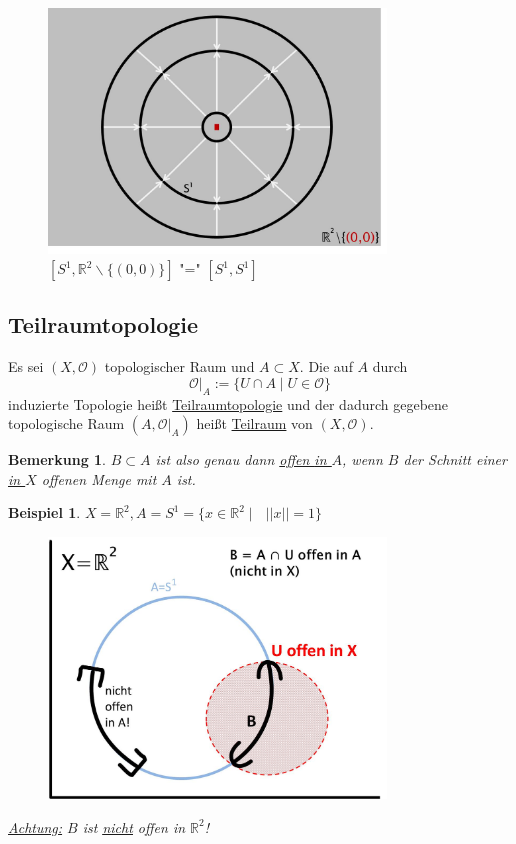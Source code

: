 \documentclass[a4paper,11pt,notitlepage]{report}
\newtheorem{remark}{Bemerkung}[chapter]
\newtheorem{example}{Beispiel}[chapter]
\newcommand{\R}{{\ensuremath{\mathbb{R}}}}
\newcommand{\OO}{{\ensuremath{\mathcal{O}}}}
\newenvironment{Kasten}[1]
{
\hspace{0.05\linewidth}
\begin{center}
\begin{minipage}{0.9\linewidth}
\setlength{\fboxsep}{10pt}
\definecolor{shadecolor}{gray}{1}
\definecolor{framecolor}{gray}{0}
\def\FrameCommand{\fcolorbox{framecolor}{shadecolor}}
\MakeFramed {\FrameRestore}
\subsection{#1}
\begin{itshape}
}
{
\end{itshape}
\endMakeFramed
\end{minipage}
\end{center}
}
\begin{document}
\begin{figure}[h]
\centering
\includegraphics[width=0.8\textwidth]{images/S1_und_R2_ohne_0.jpg}
\caption{$[S^1,\R^2\backslash\{(0,0)\}]\text{ "=" }[S^1,S^1]$}
\end{figure}

\begin{Kasten}{Teilraumtopologie}
Es sei $(X, \OO)$ topologischer Raum und $A \subset X$. Die auf $A$ durch
$$\OO \Big |_{A} := \{U \cap A \mid U \in \OO \}$$
induzierte Topologie heißt \underline{Teilraumtopologie} und der dadurch gegebene topologische Raum $(A, \OO \Big |_{A})$ heißt \underline{Teilraum} von $(X, \OO)$.
\end{Kasten}

\begin{remark}
$B \subset A$ ist also genau dann \underline{offen \underline{in $A$}}, wenn $B$ der Schnitt einer \underline{in $X$} offenen Menge mit $A$ ist.
\end{remark}

\begin{example}
$X = \R^2, A = S^1 = \{ x \in \R^2 \mid \text{ } ||x|| = 1\}$ 
\newline
\begin{figure}[h]
\centering
\includegraphics[width=0.8\textwidth]{images/Teilraumtopologie.jpg}
\end{figure}
\newline
\underline{Achtung:} $B$ ist \underline{\underline{nicht}} offen in $\R^2$!
\end{example}
\end{document}
